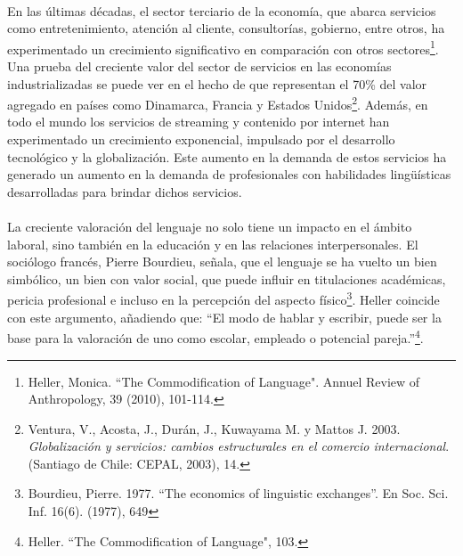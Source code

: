 \documentclass{article}
\begin{document}
    \paragraph{}
    En las últimas décadas, el sector terciario de la economía, que abarca servicios como entretenimiento, atención al cliente, consultorías, gobierno, entre otros, ha experimentado un crecimiento significativo en comparación con otros sectores\footnote{Heller, Monica. ``The Commodification of Language". Annuel Review of Anthropology, 39 (2010), 101-114.}. Una prueba del creciente valor del sector de servicios en las economías industrializadas se puede ver en el hecho de que representan el 70\% del valor agregado en países como Dinamarca, Francia y Estados Unidos\footnote{Ventura, V., Acosta, J., Durán, J., Kuwayama M. y Mattos J. 2003. \emph{Globalización y servicios: cambios estructurales en el comercio internacional}. (Santiago de Chile: CEPAL, 2003), 14.}. Además, en todo el mundo los servicios de streaming y contenido por internet han experimentado un crecimiento exponencial, impulsado por el desarrollo tecnológico y la globalización. Este aumento en la demanda de estos servicios ha generado un aumento en la demanda de profesionales con habilidades lingüísticas desarrolladas para brindar dichos servicios.
    \paragraph{}
    La creciente valoración del lenguaje no solo tiene un impacto en el ámbito laboral, sino también en la educación y en las relaciones interpersonales. El sociólogo francés, Pierre Bourdieu, señala, que el lenguaje se ha vuelto un bien simbólico, un bien con valor social, que puede influir en titulaciones académicas, pericia profesional e incluso en la percepción del aspecto físico\footnote{Bourdieu, Pierre. 1977. ``The economics of linguistic exchanges”. En Soc. Sci. Inf. 16(6). (1977), 649}. Heller coincide con este argumento, añadiendo que: ``El modo de hablar y escribir, puede ser la base para la valoración de uno como escolar, empleado o potencial pareja.”\footnote{Heller. ``The Commodification of Language", 103.}.
\end{document}
